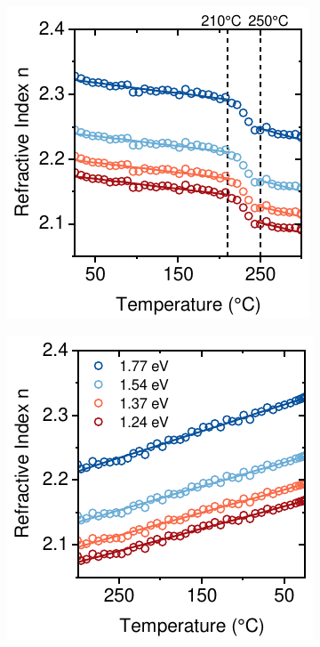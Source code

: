 \begin{figure}[htbp]
    \centering
    \begin{subfigure}{0.32\textwidth}
        \includegraphics[width=\textwidth]{chapters/ellipsometry/image/Thermo-optic_Coefficient_heating.pdf}
        \caption{}
        \label{fig:ellipsometry:thermooptic_heating}
    \end{subfigure}
    \hfill
    \begin{subfigure}{0.32\textwidth}
        \includegraphics[width=\textwidth]{chapters/ellipsometry/image/Thermo-optic_Coefficient_cooling.pdf}

\end{subfigure}
\end{figure}

